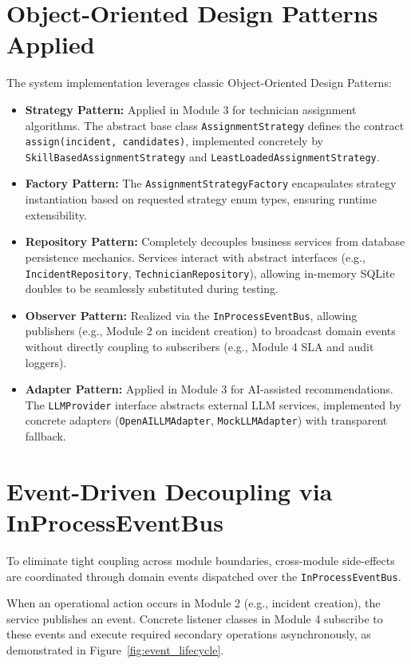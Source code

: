 \documentclass[11pt,a4paper,oneside]{report}
\begin{document}
\section{Object-Oriented Design Patterns Applied}
\label{sec:arch_patterns}
The system implementation leverages classic Object-Oriented Design Patterns:
\begin{itemize}
    \item \textbf{Strategy Pattern:} Applied in Module 3 for technician assignment algorithms. The abstract base class \texttt{AssignmentStrategy} defines the contract \texttt{assign(incident, candidates)}, implemented concretely by \texttt{SkillBasedAssignmentStrategy} and \texttt{LeastLoadedAssignmentStrategy}.
    \item \textbf{Factory Pattern:} The \texttt{AssignmentStrategyFactory} encapsulates strategy instantiation based on requested strategy enum types, ensuring runtime extensibility.
    \item \textbf{Repository Pattern:} Completely decouples business services from database persistence mechanics. Services interact with abstract interfaces (e.g., \texttt{IncidentRepository}, \texttt{TechnicianRepository}), allowing in-memory SQLite doubles to be seamlessly substituted during testing.
    \item \textbf{Observer Pattern:} Realized via the \texttt{InProcessEventBus}, allowing publishers (e.g., Module 2 on incident creation) to broadcast domain events without directly coupling to subscribers (e.g., Module 4 SLA and audit loggers).
    \item \textbf{Adapter Pattern:} Applied in Module 3 for AI-assisted recommendations. The \texttt{LLMProvider} interface abstracts external LLM services, implemented by concrete adapters (\texttt{OpenAILLMAdapter}, \texttt{MockLLMAdapter}) with transparent fallback.
\end{itemize}

\section{Event-Driven Decoupling via InProcessEventBus}
\label{sec:arch_events}
To eliminate tight coupling across module boundaries, cross-module side-effects are coordinated through domain events dispatched over the \texttt{InProcessEventBus}. 

When an operational action occurs in Module 2 (e.g., incident creation), the service publishes an event. Concrete listener classes in Module 4 subscribe to these events and execute required secondary operations asynchronously, as demonstrated in Figure~\ref{fig:event_lifecycle}.
\end{document}
